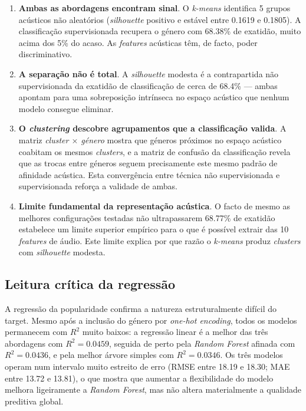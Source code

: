 \documentclass[11pt,a4paper]{article}
\begin{document}
\begin{enumerate}
    \item \textbf{Ambas as abordagens encontram sinal}. O \textit{k-means} identifica 5 grupos acústicos não aleatórios (\textit{silhouette} positivo e estável entre 0.1619 e 0.1805). A classificação supervisionada recupera o género com 68.38\% de exatidão, muito acima dos 5\% do acaso. As \textit{features} acústicas têm, de facto, poder discriminativo.

    \item \textbf{A separação não é total}. A \textit{silhouette} modesta é a contrapartida não supervisionada da exatidão de classificação de cerca de 68.4\% --- ambas apontam para uma sobreposição intrínseca no espaço acústico que nenhum modelo consegue eliminar.

    \item \textbf{O \textit{clustering} descobre agrupamentos que a classificação valida}. A matriz \textit{cluster $\times$ género} mostra que géneros próximos no espaço acústico coabitam os mesmos \textit{clusters}, e a matriz de confusão da classificação revela que as trocas entre géneros seguem precisamente este mesmo padrão de afinidade acústica. Esta convergência entre técnica não supervisionada e supervisionada reforça a validade de ambas.

    \item \textbf{Limite fundamental da representação acústica}. O facto de mesmo as melhores configurações testadas não ultrapassarem 68.77\% de exatidão estabelece um limite superior empírico para o que é possível extrair das 10 \textit{features} de áudio. Este limite explica por que razão o \textit{k-means} produz \textit{clusters} com \textit{silhouette} modesta.
\end{enumerate}

\subsection{Leitura crítica da regressão}

A regressão da popularidade confirma a natureza estruturalmente difícil do target. Mesmo após a inclusão do género por \textit{one-hot encoding}, todos os modelos permanecem com $R^2$ muito baixos: a regressão linear é a melhor das três abordagens com \textbf{$R^2 = 0.0459$}, seguida de perto pela \textit{Random Forest} afinada com \textbf{$R^2 = 0.0436$}, e pela melhor árvore simples com \textbf{$R^2 = 0.0346$}. Os três modelos operam num intervalo muito estreito de erro (RMSE entre 18.19 e 18.30; MAE entre 13.72 e 13.81), o que mostra que aumentar a flexibilidade do modelo melhora ligeiramente a \textit{Random Forest}, mas não altera materialmente a qualidade preditiva global.
\end{document}
